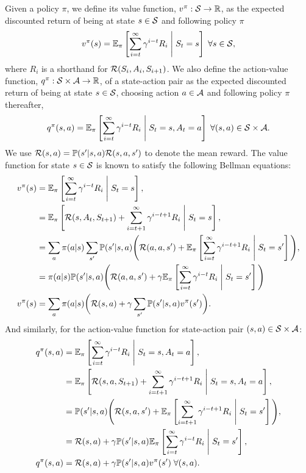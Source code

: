Given a policy $\pi$, we define its value function, $v^\pi:\mathcal{S}\rightarrow\mathbb{R}$, as the expected discounted return of being at state $s\in\mathcal{S}$ and following policy $\pi$
\begin{equation}
  v^\pi(s) = \mathbb{E}_{\pi}\left[\sum_{i=t} ^\infty \gamma ^ {i-t} R_i\;\middle\lvert\;S_t = s\right]\;\forall s\in\mathcal{S}, 
\end{equation}
where $R_i$ is a shorthand for $\mathcal{R}(S_i, A_i, S_{i+1})$. We also define the action-value function, $q^\pi:\mathcal{S}\times\mathcal{A}\rightarrow\mathbb{R}$, of a state-action pair as the expected discounted return of being at state $s\in\mathcal{S}$, choosing action $a\in\mathcal{A}$ and following policy $\pi$ thereafter,
\begin{equation}
  q^\pi(s, a) = \mathbb{E}_{\pi}\left[\sum_{i=t} ^\infty \gamma ^ {i-t} R_i\;\middle\lvert\;S_t = s, A_t = a\right]\;\forall (s, a)\in\mathcal{S}\times\mathcal{A}.
  \label{eq:def_qfunction}
\end{equation}
We use ${\mathcal{R}(s, a)} = \mathbb{P}(s'\lvert s,a)\mathcal{R}(s, a, s')$ to denote the mean reward. The value function for state $s\in\mathcal{S}$ is known to satisfy the following Bellman equations:
\begingroup
\addtolength{\jot}{1em}
\begin{align}
  v^\pi(s) &= \mathbb{E}_{\pi}\left[\sum_{i=t} ^\infty \gamma ^ {i-t} R_i\;\middle\lvert\;S_t = s\right], \nonumber \\
           &= \mathbb{E}_{\pi}\left[\mathcal{R}(s, A_t, S_{t+1}) + \sum_{i=t+1} ^\infty \gamma ^ {i-t+1} R_i\;\middle\lvert\;S_t = s\right], \nonumber \\
           &= \sum_a\pi(a\lvert s)\sum_{s'}\mathbb{P}(s'\lvert s, a) \Bigg(\mathcal{R}(a, a, s') +  \mathbb{E}_{\pi}\left[\sum_{i=t} ^\infty \gamma ^ {i-t+1} R_i \;\middle\lvert\;S_t = s'\right]\Bigg), \nonumber \\
           &= \pi(a\lvert s) \mathbb{P}(s'\lvert s, a) \Bigg(\mathcal{R}(a, a, s') +  \gamma\mathbb{E}_{\pi}\left[\sum_{i=t} ^\infty \gamma ^ {i-t} R_i \;\middle\lvert\;S_t = s'\right]\Bigg)\nonumber \\
  v^\pi(s) &= \sum_a \pi(a\lvert s)\bigg(\mathcal{R}(s, a) + \gamma \sum_{s'}\mathbb{P}(s'\lvert s, a)v^\pi(s')\bigg).
  \label{eq:vfunction}
\end{align}
And similarly, for the action-value function for state-action pair $(s,a)\in\mathcal{S}\times\mathcal{A}$:
\begin{align}
  q^\pi(s, a) &= \mathbb{E}_{\pi}\left[\sum_{i=t} ^\infty \gamma ^ {i-t} R_i\;\middle\lvert\;S_t = s, A_t = a\right], \nonumber\\
              &= \mathbb{E}_{\pi}\left[\mathcal{R}(s, a, S_{t+1}) + \sum_{i=t+1} ^\infty \gamma ^ {i-t+1} R_i\;\middle\lvert\;S_t = s, A_t = a\right], \nonumber\\
              &= \mathbb{P}(s'\lvert s, a) \Bigg( \mathcal{R}(s, a, s') + \mathbb{E}_{\pi}\left[\sum_{i=t+1} ^\infty \gamma ^ {i-t+1} R_i\;\middle\lvert\;S_t = s'\right]\Bigg), \nonumber\\
              &= \mathcal{R}(s, a) + \gamma \mathbb{P}(s'\lvert s, a)  \mathbb{E}_{\pi}\left[\sum_{i=t} ^\infty \gamma ^ {i-t} R_i\;\middle\lvert\;S_t = s'\right],\nonumber\\
  q^\pi(s, a) &= \mathcal{R}(s, a) + \gamma \mathbb{P}(s'\lvert s, a)v^\pi(s')\;\forall (s, a).
  \label{eq:qfunction}
\end{align}
